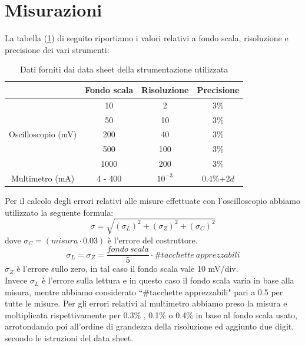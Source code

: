 \documentclass[]{article}
\begin{document}
\section{Misurazioni}
La tabella (\ref{tab:strumenti}) di seguito riportiamo i valori relativi a fondo scala, risoluzione e precisione dei vari strumenti:
	\begin{table}[H]
		\centering
		\begin{tabular}{|c|c|c|c|}
			\cline{2-4}
			\multicolumn{1}{c|}{} & Fondo scala & Risoluzione & Precisione \\
			\hline
			\multirow{5}{*}{Oscilloscopio (mV)} & 10 & 2 & 3\% \\
			\cline{2-4}
			& 50 & 10 & 3\% \\
			\cline{2-4}
			& 200 & 40 & 3\% \\
			\cline{2-4}
			&500 & 100 & 3\% \\
			\cline{2-4}
			&1000 & 200 & 3\% \\
			\hline
			Multimetro (mA) & 4 - 400 & $10^{-3}$ & 0.4\%$+2d$ \\
			\hline
		\end{tabular}
	\caption{Dati forniti dai data sheet della strumentazione utilizzata}
	\label{tab:strumenti}
	\end{table}
Per il calcolo degli errori relativi alle misure effettuate con l'oscilloscopio abbiamo utilizzato la seguente formula:
\begin{equation}
	\sigma=\sqrt{(\sigma_{L})^{2}+(\sigma_{Z})^{2}+(\sigma_{C})^{2}}
\end{equation}
dove $\sigma_{C}= (misura\cdot0.03) $ è l'errore del costruttore. 
\begin{equation*}
	\sigma_{L}=\sigma_{Z}=\frac{fondo \:scala}{5}\cdot\#tacchette \:apprezzabili
\end{equation*}
$ \sigma_{Z} $ è l'errore sullo zero, in tal caso il fondo scala vale 10 mV/div.\\
Invece $ \sigma_{L} $ è l'errore sulla lettura e in questo caso il fondo scala varia in base alla misura, mentre abbiamo considerato ``\#tacchette apprezzabili" pari a 0.5 per tutte le misure.
Per gli errori relativi al multimetro abbiamo preso la misura e moltiplicata rispettivamente per 0.3\% , 0.1\% o 0.4\%  in base al fondo scala usato, arrotondando poi all'ordine di grandezza della risoluzione ed aggiunto due digit, secondo le istruzioni del data sheet.
\end{document}
